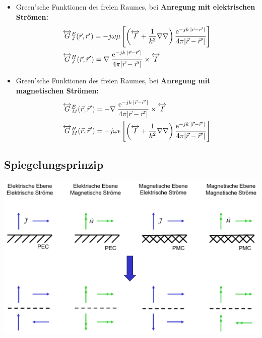 {\begin{itemize}
\begin{align*}
            &\dyade{G}^A(\vec{r},\vec{r}^\prime) = \mu\dfrac{\mathrm{e}^{-jk\:|\vec{r} - \vec{r}^\prime|}}{4\pi|\vec{r} - \vec{r}^\prime|}\dyade{I},\\
            &\dyade{G}^F(\vec{r},\vec{r}^\prime) = \epsilon\dfrac{\mathrm{e}^{-jk\:|\vec{r} - \vec{r}^\prime|}}{4\pi|\vec{r} - \vec{r}^\prime|}\dyade{I}
        \end{align*}
    \item Green'sche Funktionen des freien Raumes, bei \textbf{Anregung mit elektrischen Strömen:}\\
        \begin{align*}
            &\overleftrightarrow{G}^E_J(\vec{r},\vec{r}^\prime) = -j\omega\mu\left[\left(\overleftrightarrow{I} + \dfrac{1}{k^2}\nabla\nabla\right) \dfrac{\mathrm{e}^{-jk\:|\vec{r} - \vec{r}^\prime|}}{4\pi|\vec{r} - \vec{r}^\prime|}\right]\\
            &\overleftrightarrow{G}^H_J(\vec{r},\vec{r}^\prime) = \nabla\;\dfrac{\mathrm{e}^{-jk\:|\vec{r} - \vec{r}^\prime|}}{4\pi|\vec{r} - \vec{r}^\prime|} \times \overleftrightarrow{I}\\
        \end{align*}
    \item Green'sche Funktionen des freien Raumes, bei \textbf{Anregung mit magnetischen Strömen:}\\
        \begin{align*}
            &\overleftrightarrow{G}^E_M(\vec{r},\vec{r}^\prime) = -\nabla\;\dfrac{\mathrm{e}^{-jk\:|\vec{r} - \vec{r}^\prime|}}{4\pi|\vec{r} - \vec{r}^\prime|} \times \overleftrightarrow{I}\\
            &\overleftrightarrow{G}^H_M(\vec{r},\vec{r}^\prime) = -j\omega\epsilon\left[\left(\overleftrightarrow{I} + \dfrac{1}{k^2}\nabla\nabla\right) \dfrac{\mathrm{e}^{-jk\:|\vec{r} - \vec{r}^\prime|}}{4\pi|\vec{r} - \vec{r}^\prime|}\right]\\
        \end{align*}

\end{itemize}
\subsection{Spiegelungsprinzip}
\includegraphics[width = 0.35\paperheight]{content/fuw/pictures/fuw_spiegelungsprinzip.png}
}
